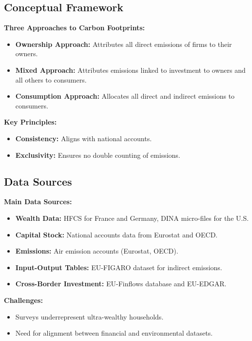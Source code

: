 \documentclass[10pt]{beamer}
\begin{document}
\begin{frame}{\secname}
    \tableofcontents[currentsection, hideothersubsections, sections=\value{section}]
\end{frame}

\subsection{Conceptual Framework}
\begin{frame}{\subsecname}
    \textbf{Three Approaches to Carbon Footprints:}
    \begin{itemize}
        \item \textbf{Ownership Approach:} Attributes all direct emissions of firms to their owners.
        \item \textbf{Mixed Approach:} Attributes emissions linked to investment to owners and all others to consumers.
        \item \textbf{Consumption Approach:} Allocates all direct and indirect emissions to consumers.
    \end{itemize}
    \vspace{0.3cm}
    \textbf{Key Principles:}
    \begin{itemize}
        \item \textbf{Consistency:} Aligns with national accounts.
        \item \textbf{Exclusivity:} Ensures no double counting of emissions.
    \end{itemize}
\end{frame}

\subsection{Data Sources}
\begin{frame}{\subsecname}
    \textbf{Main Data Sources:}
    \begin{itemize}
        \item \textbf{Wealth Data:} HFCS for France and Germany, DINA micro-files for the U.S.
        \item \textbf{Capital Stock:} National accounts data from Eurostat and OECD.
        \item \textbf{Emissions:} Air emission accounts (Eurostat, OECD).
        \item \textbf{Input-Output Tables:} EU-FIGARO dataset for indirect emissions.
        \item \textbf{Cross-Border Investment:} EU-Finflows database and EU-EDGAR.
    \end{itemize}
    \vspace{0.3cm}
    \textbf{Challenges:}
    \begin{itemize}
        \item Surveys underrepresent ultra-wealthy households.
        \item Need for alignment between financial and environmental datasets.
    \end{itemize}
\end{frame}
\end{document}
